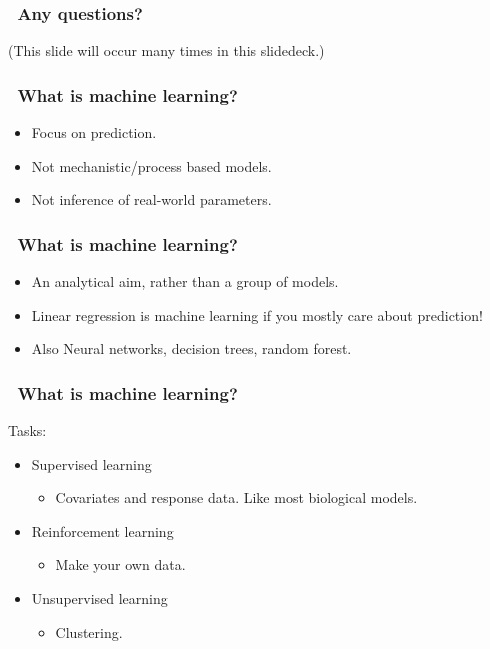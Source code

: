 \documentclass[handout, aspectratio = 169]{beamer}
\begin{document}
\begin{frame}
\frametitle{\insertframenumber~Any questions?}

(This slide will occur many times in this slidedeck.)

\end{frame} 












\begin{frame}
\frametitle{\insertframenumber~What is machine learning?}
\begin{itemize}
\item Focus on prediction.
\item Not mechanistic/process based models.
\item Not inference of real-world parameters.
\end{itemize}
\end{frame} 







\begin{frame}
\frametitle{\insertframenumber~What is machine learning?}

\begin{itemize}
\item An analytical aim, rather than a group of models.
\item Linear regression is machine learning if you mostly care about prediction!
\item Also Neural networks, decision trees, random forest.
\end{itemize}

\end{frame} 




\begin{frame}
\frametitle{\insertframenumber~What is machine learning?}
Tasks:
\begin{itemize}
\item Supervised learning
\begin{itemize}
\item Covariates and response data. Like most biological models.
\end{itemize}
\item Reinforcement learning
\begin{itemize}
\item Make your own data.
\end{itemize}
\item Unsupervised learning
\begin{itemize}
\item Clustering.
\end{itemize}
\end{itemize}
\end{frame} 
\end{document}
